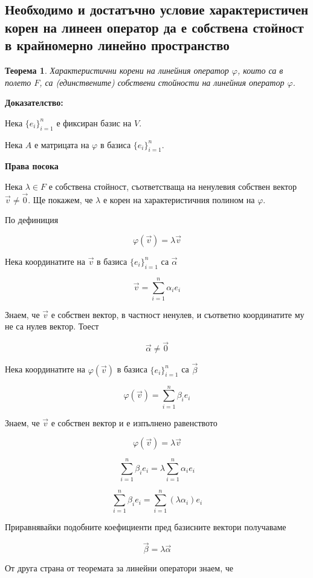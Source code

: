 \documentclass{scrartcl}
\newtheorem{theorem}{Теорема}
\begin{document}
\begin{FlushLeft}
\section{Необходимо и достатъчно
условие характеристичен корен на линеен оператор да е собствена стойност в
крайномерно линейно пространство}

\begin{theorem}
Характеристични корени на линейния оператор $\varphi$, които са в полето $F$, са (единствените) собствени стойности на линейния оператор $\varphi$.
\end{theorem}

\textbf{Доказателство:}

Нека $\{e_i\}_{i=1}^n$ е фиксиран базис на $V$.

Нека $A$ е матрицата на $\varphi$ в базиса $\{e_i\}_{i=1}^n$.

\textbf{Права посока}

Нека $\lambda \in F$ е собствена стойност, съответстваща на ненулевия собствен вектор $\vec{v} \neq \vec{0}$. Ще покажем, че $\lambda$ е корен на характеристичния полином на $\varphi$.

По дефиниция

$$\varphi(\vec{v}) = \lambda \vec{v}$$

Нека координатите на $\vec{v}$ в базиса $\{e_i\}_{i=1}^n$ са $\vec{\alpha}$

$$\vec{v} = \sum_{i=1}^n \alpha_i e_i$$

Знаем, че $\vec{v}$ е собствен вектор, в частност ненулев, и съответно координатите му не са нулев вектор. Тоест

$$\vec{\alpha} \ne \vec{0}$$

Нека координатите на $\varphi(\vec{v})$ в базиса $\{e_i\}_{i=1}^n$ са $\vec{\beta}$

$$\varphi(\vec{v}) = \sum_{i=1}^n \beta_i e_i$$

Знаем, че $\vec{v}$ е собствен вектор и е изпълнено равенството

$$\varphi(\vec{v}) = \lambda \vec{v}$$

$$\sum_{i=1}^n \beta_i e_i = \lambda \sum_{i=1}^n \alpha_i e_i$$

$$\sum_{i=1}^n \beta_i e_i = \sum_{i=1}^n (\lambda\alpha_i) e_i$$

Приравнявайки подобните коефициенти пред базисните вектори получаваме

$$\vec{\beta} = \lambda \vec{\alpha}$$

От друга страна от теоремата за линейни оператори знаем, че


\end{FlushLeft}
\end{document}
